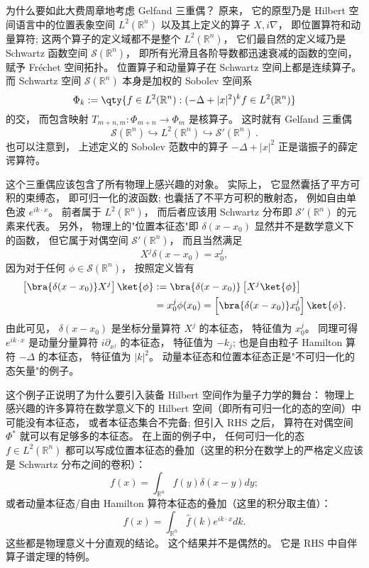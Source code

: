     为什么要如此大费周章地考虑 Gelfand 三重偶？ 原来， 它的原型乃是 Hilbert 空间语言中的位置表象空间 $L^2(\mathbb{R}^n)$ 以及其上定义的算子 $X,i\nabla$， 即位置算符和动量算符; 这两个算子的定义域都不是整个 $L^2(\mathbb{R}^n)$， 它们最自然的定义域乃是 Schwartz 函数空间 $\mathcal{S}(\mathbb{R}^n)$， 即所有光滑且各阶导数都迅速衰减的函数的空间， 赋予 Fréchet 空间拓扑。 位置算子和动量算子在 Schwartz 空间上都是连续算子。 而 Schwartz 空间 $\mathcal{S}(\mathbb{R}^n)$ 本身是加权的 Sobolev 空间系
$$
\Phi_k := \qty{f \in L^2 (\mathbb{R}^n): (-\Delta + |x|^ 2)^{k} f \in L^2 (\mathbb{R}^n) }
$$
的交， 而包含映射 $T_{m+n,m}:\Phi_{m+n}\to\Phi_m$ 是核算子。 这时就有 Gelfand 三重偶$$
\mathcal{S}(\mathbb{R}^n)\hookrightarrow L^2(\mathbb{R}^n)\hookrightarrow \mathcal{S}'(\mathbb{R}^n)~.
$$也可以注意到， 上述定义的 Sobolev 范数中的算子 $-\Delta+|x|^2$ 正是谐振子的薛定谔算符。

    这个三重偶应该包含了所有物理上感兴趣的对象。 实际上， 它显然囊括了平方可积的束缚态， 即可归一化的波函数; 也囊括了不平方可积的散射态， 例如自由单色波 $e^{ik\cdot x}$。 前者属于 $L^2(\mathbb{R}^n)$， 而后者应该用 Schwartz 分布即 $\mathcal{S}'(\mathbb{R}^n)$ 的元素来代表。 另外， 物理上的"位置本征态"即 $\delta(x-x_0)$ 显然并不是数学意义下的函数， 但它属于对偶空间 $\mathcal{S}'(\mathbb{R}^n)$， 而且当然满足
$$
X^j\delta(x-x_0)=x_0^j,
$$
因为对于任何 $\phi\in\mathcal{S}(\mathbb{R}^n)$， 按照定义皆有
$$
\begin{aligned}
\left[\bra{\delta(x-x_0)}X^j\right]\ket{\phi}
&:=\bra{\delta(x-x_0)}\left[X^j\ket{\phi}\right]\\
&=x_0^j\phi(x_0)
=\left[\bra{\delta(x-x_0)}x_0^j\right]\ket{\phi}.
\end{aligned}
$$
由此可见， $\delta(x-x_0)$ 是坐标分量算符 $X^j$ 的本征态， 特征值为 $x_0^j$。 同理可得 $e^{ik\cdot x}$ 是动量分量算符 $i\partial_{x^j}$ 的本征态， 特征值为 $-k_j$; 也是自由粒子 Hamilton 算符 $-\Delta$ 的本征态， 特征值为 $|k|^2$。 动量本征态和位置本征态正是"不可归一化的态矢量"的例子。 

    这个例子正说明了为什么要引入装备 Hilbert 空间作为量子力学的舞台： 物理上感兴趣的许多算符在数学意义下的 Hilbert 空间（即所有可归一化的态的空间）中可能没有本征态， 或者本征态集合不完备; 但引入 RHS 之后， 算符在对偶空间 $\Phi^*$ 就可以有足够多的本征态。 在上面的例子中， 任何可归一化的态 $f\in{L^2}(\mathbb{R}^n)$ 都可以写成位置本征态的叠加（这里的积分在数学上的严格定义应该是 Schwartz 分布之间的卷积）：
$$
f(x)=\int_{\mathbb{R}^n}f(y)\delta(x-y)dy;
$$    
或者动量本征态/自由 Hamilton 算符本征态的叠加（这里的积分取主值）：
$$
f(x)=\int_{\mathbb{R}^n}\hat f(k)e^{ik\cdot x}dk.
$$
这些都是物理意义十分直观的结论。 这个结果并不是偶然的。 它是 RHS 中自伴算子谱定理的特例。
